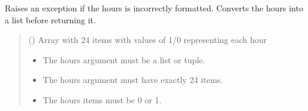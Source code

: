 \documentclass[letterpaper,10pt,english]{sphinxmanual}
\begin{document}
\begin{fulllineitems}
\begin{fulllineitems}
\begin{quote}
\begin{description}
\end{description}\end{quote}

\end{fulllineitems}


\begin{fulllineitems}
\label{\detokenize{PodApi.Devices:PodApi.Devices.PodDevice_8229.Pod8229._Validate_Hours}}
\pysigstartsignatures
{}
\pysigstopsignatures
\sphinxAtStartPar
Raises an exception if the hours is incorrectly formatted. Converts the hours         into a list before returning it.
\begin{quote}\begin{description}
\sphinxAtStartPar
{} (\sphinxstyleliteralemphasis{\sphinxupquote{ | }}\sphinxstyleliteralemphasis{\sphinxupquote{{[}}}\sphinxstyleliteralemphasis{\sphinxupquote{ | }}\sphinxstyleliteralemphasis{\sphinxupquote{{]}}}) \textendash{} Array with 24 items with values of 1/0                 representing each hour

\begin{itemize}
\item {} 
\sphinxAtStartPar
{} \textendash{} The hours argument must be a list or tuple.

\item {} 
\sphinxAtStartPar
{} \textendash{} The hours argument must have exactly 24 items.

\item {} 
\sphinxAtStartPar
{} \textendash{} The hours items must be 0 or 1.


\end{itemize}
\end{description}
\end{quote}
\end{fulllineitems}
\end{fulllineitems}
\end{document}
